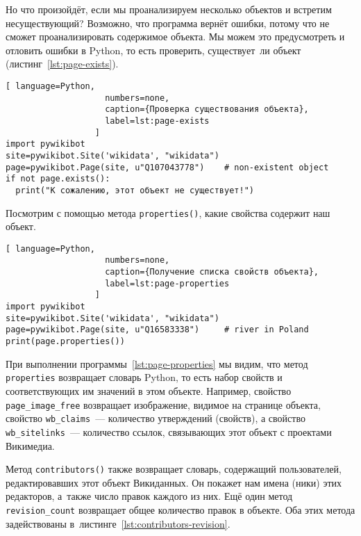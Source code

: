 Но что произойдёт, если мы проанализируем несколько объектов и встретим несуществующий? 
Возможно, что программа вернёт ошибки, потому что не сможет проанализировать содержимое объекта. 
Мы можем это предусмотреть и отловить ошибки в Python, то есть проверить, существует~ли объект (листинг~\ref{lst:page-exists}).

\begin{lstlisting}[ language=Python,
                    numbers=none,
                    caption={Проверка существования объекта},
                    label=lst:page-exists
                  ]
import pywikibot
site=pywikibot.Site('wikidata', "wikidata")
page=pywikibot.Page(site, u"Q107043778")    # non-existent object
if not page.exists():
  print("К сожалению, этот объект не существует!")
\end{lstlisting}


Посмотрим с помощью метода \lstinline|properties()|, 
какие свойства содержит наш объект.

\begin{lstlisting}[ language=Python,
                    numbers=none,
                    caption={Получение списка свойств объекта},
                    label=lst:page-properties
                  ]
import pywikibot
site=pywikibot.Site('wikidata', "wikidata")
page=pywikibot.Page(site, u"Q16583338")     # river in Poland
print(page.properties())
\end{lstlisting}

При выполнении программы~\ref{lst:page-properties} мы видим, что метод \lstinline|properties| 
возвращает словарь Python, то есть набор свойств и соответствующих им значений в этом объекте. 
Например, свойство \lstinline|page_image_free| возвращает изображение, видимое на странице объекта, 
свойство \lstinline|wb_claims|~--- количество утверждений (свойств), 
а свойство \lstinline|wb_sitelinks|~--- количество ссылок, связывающих этот объект с проектами Викимедиа.

Метод \lstinline|contributors()| также возвращает словарь, содержащий пользователей, 
редактировавших этот объект Викиданных. 
Он покажет нам имена (ники) этих редакторов, 
а~также число правок каждого из них. 
Ещё один метод \lstinline|revision_count| возвращает общее количество правок в объекте. Оба этих метода задействованы в~листинге~\ref{lst:contributors-revision}.

